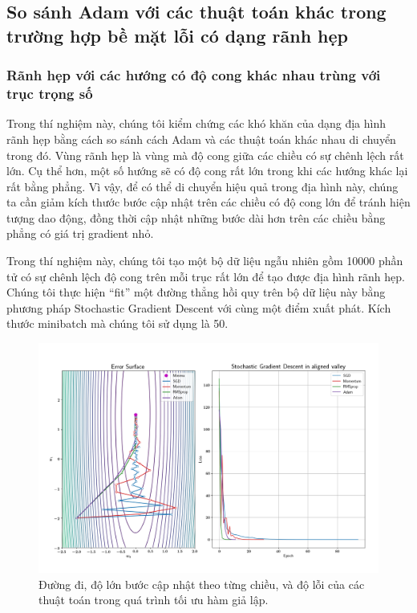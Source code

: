 \subsection{So sánh Adam với các thuật toán khác trong trường hợp bề mặt lỗi có dạng rãnh hẹp}

\subsubsection{Rãnh hẹp với các hướng có độ cong khác nhau trùng với trục trọng số}
\label{exp:aligned}

Trong thí nghiệm này, chúng tôi kiểm chứng các khó khăn của dạng địa hình rãnh hẹp bằng cách so sánh cách Adam và các thuật toán khác nhau di chuyển trong đó. Vùng rãnh hẹp là vùng mà độ cong giữa các chiều có sự chênh lệch rất lớn. Cụ thể hơn, một số hướng sẽ có độ cong rất lớn trong khi các hướng khác lại rất bằng phẳng. Vì vậy, để có thể di chuyển hiệu quả trong địa hình này, chúng ta cần giảm kích thước bước cập nhật trên các chiều có độ cong lớn để tránh hiện tượng dao động, đồng thời cập nhật những bước dài hơn trên các chiều bằng phẳng có giá trị gradient nhỏ.

Trong thí nghiệm này, chúng tôi tạo một bộ dữ liệu ngẫu nhiên gồm 10000 phần tử có sự chênh lệch độ cong trên mỗi trục rất lớn để tạo được địa hình rãnh hẹp. Chúng tôi thực hiện ``fit'' một đường thẳng hồi quy trên bộ dữ liệu này bằng phương pháp Stochastic Gradient Descent với cùng một điểm xuất phát. Kích thước minibatch mà chúng tôi sử dụng là 50.

\begin{figure}[htp]
	\centering
	\includegraphics[width=140 mm]{images/aligned.png}
	\caption{Đường đi, độ lớn bước cập nhật theo từng chiều, và độ lỗi của các thuật toán trong quá trình tối ưu hàm giả lập.}
	\label{fig:aligned}
\end{figure}

